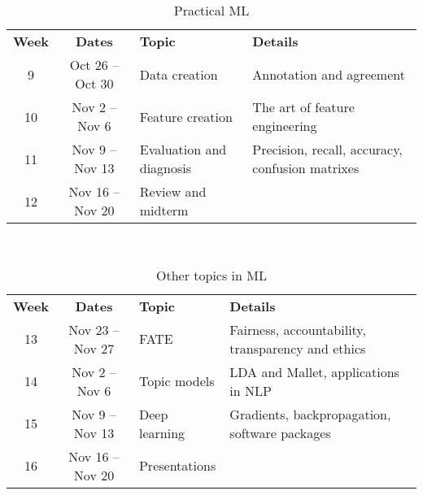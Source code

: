 \documentclass[10pt]{memoir}
\begin{document}
\begin{table}[htb!]
\centering
\begin{tabular}{ccll}
     \textbf{Week} & \textbf{Dates} & \textbf{Topic} & \textbf{Details}   \\
    \cmidrule[.1em](lr){1-4}
    
     9 & Oct 26 -- Oct 30 & Data creation &  Annotation and agreement \\
    \cmidrule[.1em](lr){1-4} 
 
     10 & Nov 2 -- Nov 6 & Feature creation &  The art of feature engineering \\
    \cmidrule[.1em](lr){1-4} 

     11 & Nov 9 -- Nov 13 & Evaluation and diagnosis &  Precision, recall, accuracy, confusion matrixes \\
    \cmidrule[.1em](lr){1-4} 

     12 & Nov 16 -- Nov 20 & Review and midterm &   \\
    \cmidrule[.1em](lr){1-4} 

\end{tabular}\\
\caption{Practical ML}
\end{table}

\begin{table}[htb!]
\centering
\begin{tabular}{ccll}
     \textbf{Week} & \textbf{Dates} & \textbf{Topic} & \textbf{Details}   \\
    \cmidrule[.1em](lr){1-4}
    
     13  & Nov 23 -- Nov 27 & FATE &   Fairness, accountability, transparency and ethics \\
    \cmidrule[.1em](lr){1-4} 
 
     14 & Nov 2 -- Nov 6 & Topic models &  LDA and Mallet, applications in NLP \\
    \cmidrule[.1em](lr){1-4} 

     15 & Nov 9 -- Nov 13 & Deep learning &  Gradients, backpropagation, software packages \\
    \cmidrule[.1em](lr){1-4} 

     16  & Nov 16 -- Nov 20 & Presentations &   \\
    \cmidrule[.1em](lr){1-4} 
    

\end{tabular}\\
\caption{Other topics in ML}
\end{table}
\end{document}
